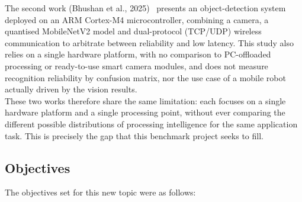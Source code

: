 \documentclass[12pt,a4paper]{report}
\begin{document}
	The second work (Bhushan et al., 2025)~\cite{bhushan2025} presents an object-detection system deployed on an ARM Cortex-M4 microcontroller, combining a camera, a quantised MobileNetV2 model and dual-protocol (TCP/UDP) wireless communication to arbitrate between reliability and low latency.\newline
	This study also relies on a single hardware platform, with no comparison to PC-offloaded processing or ready-to-use smart camera modules, and does not measure recognition reliability by confusion matrix, nor the use case of a mobile robot actually driven by the vision results.\\
	
	These two works therefore share the same limitation: each focuses on a single hardware platform and a single processing point, without ever comparing the different possible distributions of processing intelligence for the same application task. This is precisely the gap that this benchmark project seeks to fill.
	
	\subsection*{Objectives}
	
	The objectives set for this new topic were as follows:
	
\end{document}
